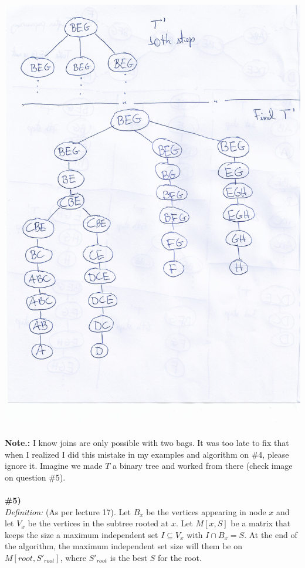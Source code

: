 \documentclass{article}
\begin{document}
\includegraphics[scale=0.7]{2nd_demo_graph_hw3}
\\
\\
\textbf{Note.:} I know joins are only possible with two bags. It was too late to fix that when I realized I did this mistake in my examples and algorithm on \#4, please ignore it. Imagine we made $T$ a binary tree and worked from there (check image on question \#5).
\\
\\
\textbf{\#5)}
\\
\textit{Definition:} (As per lecture 17). Let $B_x$ be the vertices appearing in node $x$ and let $V_x$ be the vertices in the subtree rooted at $x$. Let $M[x, S]$ be a matrix that keeps the size a maximum independent set $I \subseteq V_x$ with $I \cap B_x = S$. At the end of the algorithm, the maximum independent set size will them be on $M[root, S'_{root}]$, where $S'_{root}$ is the best $S$ for the root.\\
\end{document}
